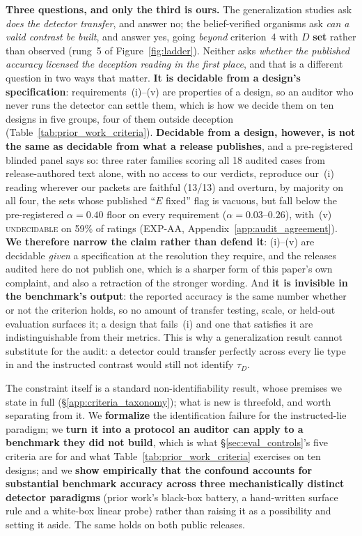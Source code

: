 \textbf{Three questions, and only the third is ours.} The generalization studies ask \emph{does the detector transfer}, and answer no; the belief-verified organisms ask \emph{can a valid contrast be built}, and answer yes, going \emph{beyond} criterion~4 with $D$ \textbf{set} rather than observed (rung~5 of Figure~\ref{fig:ladder}). Neither asks \emph{whether the published accuracy licensed the deception reading in the first place}, and that is a different question in two ways that matter. \textbf{It is decidable from a design's specification}: requirements~(i)--(v) are properties of a design, so an auditor who never runs the detector can settle them, which is how we decide them on ten designs in five groups, four of them outside deception (Table~\ref{tab:prior_work_criteria}). \textbf{Decidable from a design, however, is not the same as decidable from what a release publishes}, and a pre-registered blinded panel says so: three rater families scoring all 18 audited cases from release-authored text alone, with no access to our verdicts, reproduce our~(i) reading wherever our packets are faithful (13/13) and overturn, by majority on all four, the sets whose published ``$E$ fixed'' flag is vacuous, but fall below the pre-registered $\alpha\!=\!0.40$ floor on every requirement ($\alpha\!=\!0.03$--$0.26$), with~(v) \textsc{undecidable} on 59\% of ratings (EXP-AA, Appendix~\ref{app:audit_agreement}). \textbf{We therefore narrow the claim rather than defend it}: (i)--(v) are decidable \emph{given} a specification at the resolution they require, and the releases audited here do not publish one, which is a sharper form of this paper's own complaint, and also a retraction of the stronger wording. And \textbf{it is invisible in the benchmark's output}: the reported accuracy is the same number whether or not the criterion holds, so no amount of transfer testing, scale, or held-out evaluation surfaces it; a design that fails~(i) and one that satisfies it are indistinguishable from their metrics. This is why a generalization result cannot substitute for the audit: a detector could transfer perfectly across every lie type in \citet{kretschmar2025liarsbench} and the instructed contrast would still not identify $\tau_D$.

The constraint itself is a standard non-identifiability result, whose premises we state in full (§\ref{app:criteria_taxonomy}); what is new is threefold, and worth separating from it. We \textbf{formalize} the identification failure for the instructed-lie paradigm; we \textbf{turn it into a protocol an auditor can apply to a benchmark they did not build}, which is what §\ref{sec:eval_controls}'s five criteria are for and what Table~\ref{tab:prior_work_criteria} exercises on ten designs; and we \textbf{show empirically that the confound accounts for substantial benchmark accuracy across three mechanistically distinct detector paradigms} (prior work's black-box battery, a hand-written surface rule and a white-box linear probe) rather than raising it as a possibility and setting it aside. The same holds on both public releases.
